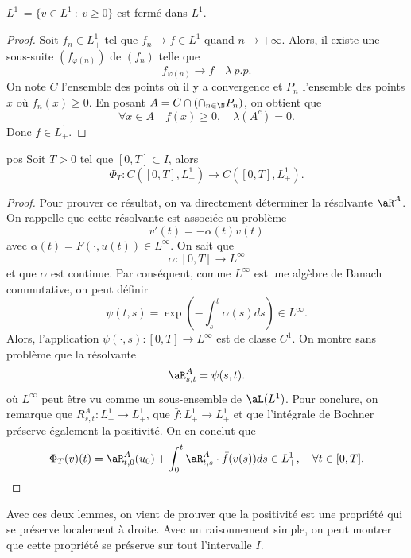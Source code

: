 \begin{lem}{}{}
	$L^1_+ = \{v \in L^1 \ : \ v \ge 0\}$ est fermé dans $L^1$.
\end{lem}

\begin{proof}
	Soit $f_n \in L^1_+$ tel que $f_n \to f \in L^1$ quand $n \to +\infty$. Alors, il existe une sous-suite $(f_{\varphi(n)})$ de $(f_n)$ telle que
	\[
		f_{\varphi(n)} \to f \quad \lambda \ p.p.
	\]
	On note $C$ l'ensemble des points où il y a convergence et $P_n$ l'ensemble des points $x$ où $f_n(x) \ge 0$. En posant
	$A = C \cap \left(\cap_{n \in \N}P_n \right)$,
	on obtient que
	\[
		\forall x \in A \quad f(x) \ge 0, \quad \lambda(A^c) = 0.
	\]
	Donc $f \in L^1_+$.
\end{proof}

\begin{lem}{}{pos}
	Soit $T > 0$ tel que $[0,T] \subset I$, alors
	\[
		\Phi_T : C([0,T], L^1_+) \to C([0,T], L^1_+).
	\]
\end{lem}

\begin{proof}
	Pour prouver ce résultat, on va directement déterminer la résolvante $\aR^A$. On rappelle que cette résolvante est associée au problème
	\begin{equation}
		v'(t) = - \alpha(t) v(t)
		\label{eq:ev_fin}
	\end{equation}
	avec $\alpha(t) = F(\cdot, u(t)) \in L^{\infty}$. On sait que
	\[
		\alpha : [0,T] \to L^\infty
	\]
	et que $\alpha$ est continue. Par conséquent, comme $L^\infty$ est une algèbre de Banach commutative, on peut définir
	\[
		\psi(t,s) = \exp\left(-\int_s^t \alpha(s) ds \right) \in L^\infty.
	\]
	Alors, l'application $\psi(\cdot , s) : [0,T] \to L^\infty$ est de classe $C^1$.
	On montre sans problème que la résolvante
	\[
		\aR^A_{s,t} = \psi(s,t).
	\]
	où $L^\infty$ peut être vu comme un sous-ensemble de $\aL(L^1)$.
	Pour conclure, on remarque que $R_{s,t}^A : L^1_+ \to L^1_+$, que $\bar f : L^1_+ \to L^1_+$ et que
	l'intégrale de Bochner préserve également la positivité. On en conclut que
	\[
		\Phi_T(v)(t) = \aR^A_{t,0}(u_0) + \int_{0}^t \aR^A_{t,s} \cdot \bar f (v(s)) ds \in L^1_+, \quad \forall t \in [0,T].
	\]
\end{proof}

Avec ces deux lemmes, on vient de prouver que la positivité est une propriété qui se préserve localement à droite.
Avec un raisonnement simple, on peut montrer que cette propriété se préserve sur tout l'intervalle $I$.

